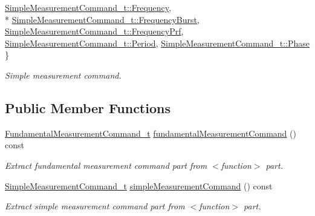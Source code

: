 \begin{DoxyCompactItemize}
\hyperlink{structmdt_scpi_function_farameter_a45845a283cab9adc77c0b9e9b00179bba7cf395303ce3665a9834721d4b748e4b}{Simple\-Measurement\-Command\-\_\-t\-::\-Frequency}, 
\\*
\hyperlink{structmdt_scpi_function_farameter_a45845a283cab9adc77c0b9e9b00179bba3c25dd9ade6deb368e1ac5bab4035570}{Simple\-Measurement\-Command\-\_\-t\-::\-Frequency\-Burst}, 
\hyperlink{structmdt_scpi_function_farameter_a45845a283cab9adc77c0b9e9b00179bba65d156dc6dabcfd7d67a47f842eb1bce}{Simple\-Measurement\-Command\-\_\-t\-::\-Frequency\-Prf}, 
\hyperlink{structmdt_scpi_function_farameter_a45845a283cab9adc77c0b9e9b00179bba1901606ea069a83dc7beea17881ef95a}{Simple\-Measurement\-Command\-\_\-t\-::\-Period}, 
\hyperlink{structmdt_scpi_function_farameter_a45845a283cab9adc77c0b9e9b00179bba5e35d7fff7b903516cba242ff68fc6d3}{Simple\-Measurement\-Command\-\_\-t\-::\-Phase}
 \}
\begin{DoxyCompactList}\small\item\em Simple measurement command. \end{DoxyCompactList}\end{DoxyCompactItemize}
\subsection*{Public Member Functions}
\begin{DoxyCompactItemize}
\item 
\hyperlink{structmdt_scpi_function_farameter_a6c66a5f0deed788e511aa28e3683cf7e}{Fundamental\-Measurement\-Command\-\_\-t} \hyperlink{structmdt_scpi_function_farameter_a8a47f7f4fbc47a271821744520e8d3cc}{fundamental\-Measurement\-Command} () const 
\begin{DoxyCompactList}\small\item\em Extract fundamental measurement command part from $<$function$>$ part. \end{DoxyCompactList}\item 
\hyperlink{structmdt_scpi_function_farameter_a45845a283cab9adc77c0b9e9b00179bb}{Simple\-Measurement\-Command\-\_\-t} \hyperlink{structmdt_scpi_function_farameter_aed7d43d880af1b44cfc9f1f1eb8ad260}{simple\-Measurement\-Command} () const 
\begin{DoxyCompactList}\small\item\em Extract simple measurement command part from $<$function$>$ part. \end{DoxyCompactList}\end{DoxyCompactItemize}
